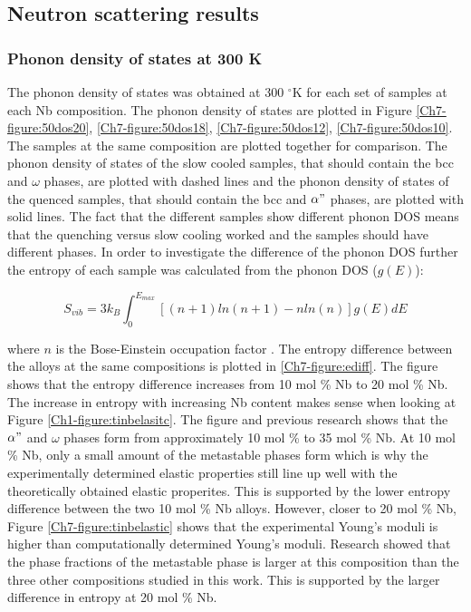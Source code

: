 \subsection{Neutron scattering results}

\subsubsection{Phonon density of states at 300 K}

The phonon density of states was obtained at 300 $^\circ$K for each set of samples at each Nb composition. The phonon density of states are plotted in Figure \ref{Ch7-figure:50dos20}, \ref{Ch7-figure:50dos18}, \ref{Ch7-figure:50dos12}, \ref{Ch7-figure:50dos10}. The samples at the same composition are plotted together for comparison. The phonon density of states of the slow cooled samples, that should contain the bcc and $\omega$ phases, are plotted with dashed lines and the phonon density of states of the quenced samples, that should contain the bcc and $\alpha "$ phases, are plotted with solid lines. The fact that the different samples show different phonon DOS means that the quenching versus slow cooling worked and the samples should have different phases. In order to investigate the difference of the phonon DOS further the entropy of each sample was calculated from the phonon DOS ($g(E)$):

\begin{equation}
\label{eq:phononentropy}
S_{vib} = 3 k_{B} \int_{0}^{E_{max}} \left[ \left( n+1 \right) ln\left(n+1\right) -n ln\left(n\right) \right] g(E) dE
\end{equation}

\noindent where $n$ is the Bose-Einstein occupation factor \cite{Budai2014}. The entropy difference between the alloys at the same compositions is plotted in \ref{Ch7-figure:ediff}. The figure shows that the entropy difference increases from 10 mol \% Nb to 20 mol \% Nb. The increase in entropy with increasing Nb content makes sense when looking at Figure \ref{Ch1-figure:tinbelasitc}. The figure and previous research shows that the $\alpha"$ and $\omega$ phases form from approximately 10 mol \% to 35 mol \% Nb. At 10 mol \% Nb, only a small amount of the metastable phases form which is why the experimentally determined elastic properties still line up well with the theoretically obtained elastic properites. This is supported by the lower entropy difference between the two 10 mol \% Nb alloys. However, closer to 20 mol \% Nb, Figure \ref{Ch7-figure:tinbelastic} shows that the experimental Young's moduli is higher than computationally determined Young's moduli. Research showed that the phase fractions of the metastable phase is larger at this composition than the three other compositions studied in this work. This is supported by the larger difference in entropy at 20 mol \% Nb.

